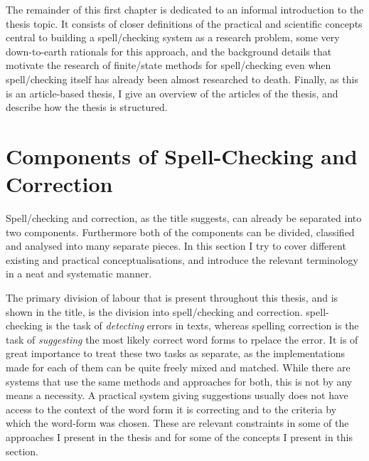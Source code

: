 \documentclass[officiallayout,final]{unihelcompling}
\begin{document}
The remainder of this first chapter is dedicated to an informal introduction to
the thesis topic. It consists of closer definitions of the practical and
scientific concepts central to building a spell\-/checking system as a research
problem, some very down-to-earth rationals for this approach, and the
background details that motivate the research of finite\-/state methods for
spell\-/checking even when spell\-/checking itself has already been almost
researched to death. Finally, as this is an article-based thesis, I give an
overview of the articles of the thesis, and describe how the thesis is
structured.

\section{Components of Spell-Checking and Correction}
\label{sec:practical-components}

Spell\-/checking and correction, as the title suggests, can already be
separated into two components. Furthermore both of the components can be
divided, classified and analysed into many separate pieces. In this section I
try to cover different existing and practical conceptualisations, and introduce
the relevant terminology in a neat and systematic manner.

The primary division of labour that is present throughout this thesis, and is shown
in the title, is the division into spell\-/checking and correction.
\Gls{spell-checking} is the task of \emph{detecting} errors in texts,
whereas \gls{spelling correction} is the task of \emph{suggesting} the most
likely correct \glspl{word form} to rpelace the error. It is of great
importance to treat these two tasks as separate, as the implementations made
for each of them can be quite freely mixed and matched.  While there are
systems that use the same methods and approaches for both, this is not by any
means a necessity. A practical system giving suggestions usually does not have
access to the context of the word form it is correcting and to the criteria by
which the word-form was chosen. These are relevant constraints in some of the
approaches I present in the thesis and for some of the concepts I present in
this section.
\end{document}
